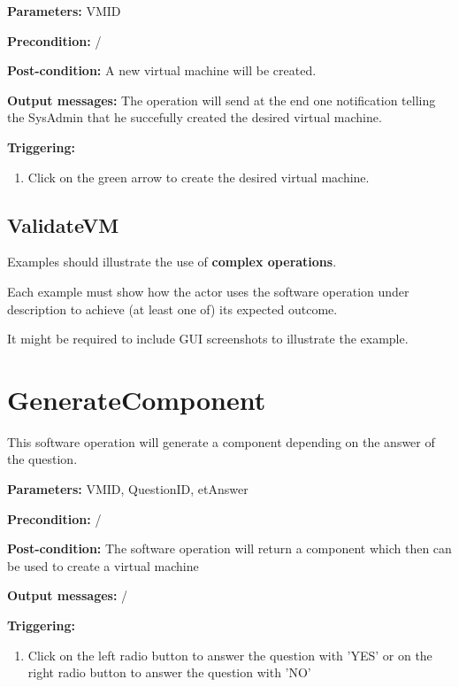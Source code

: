 \begin{description}

\item \textbf{Parameters:} VMID
\item \textbf{Precondition:} /
\item \textbf{Post-condition:} A new virtual machine will be created.
\item \textbf{Output messages:} The operation will send at the end one
notification telling the SysAdmin that he succefully created the desired virtual
machine.

\item \textbf{Triggering:}
\begin{enumerate}
\item Click on the green arrow to create the desired virtual machine.
\end{enumerate}

 
\end{description}

 
\subsection{ValidateVM}
Examples should illustrate the use of \textbf{complex operations}.

Each example must show how the actor uses the software operation under
description to achieve (at least one of) its expected outcome.

It might be required to include GUI screenshots to illustrate the example.








\section{GenerateComponent}
\label{operation:GenerateComponent}
This software operation will generate a component depending on the answer of the
question.
\begin{description}

\item \textbf{Parameters:} VMID, QuestionID, etAnswer
\item \textbf{Precondition:} /
\item \textbf{Post-condition:} The software operation will return a component
which then can be used to create a virtual machine
\item \textbf{Output messages:} /

\item \textbf{Triggering:}
\begin{enumerate}
\item Click on the left radio button to answer the question with ’YES’ or on 
the right radio button to answer the question with ’NO’

\end{enumerate}

 
\end{description}

